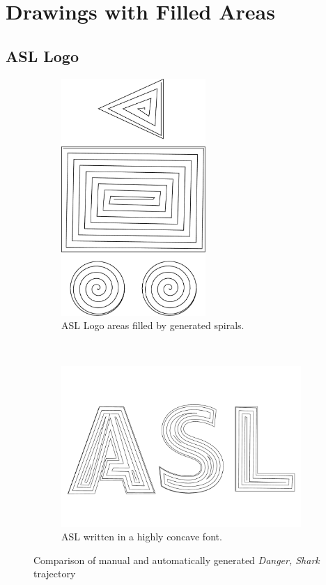 \section{Drawings with Filled Areas}

\subsection{ASL Logo}

\begin{figure}[h]
\centering
\begin{subfigure}[t]{0.95\textwidth}
\centering
	\includegraphics[height=9cm]{images/results/asl/asl_logo_spiral.pdf}
	\caption{ASL Logo areas filled by generated spirals.}
\end{subfigure}\\
\begin{subfigure}[t]{0.95\textwidth}
	\includegraphics[width=\textwidth]{images/results/asl/asl_font.pdf}
	\caption{ASL written in a highly concave font.}
\end{subfigure}
\caption{Comparison of manual and automatically generated \textit{Danger, Shark} trajectory}
\end{figure}


